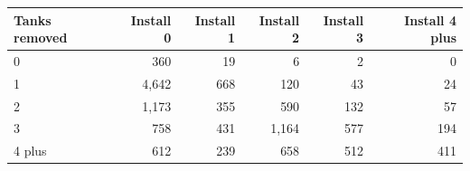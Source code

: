 \begin{tabular}{lrrrrr}
\toprule
Tanks removed & Install 0 & Install 1 & Install 2 & Install 3 & Install 4 plus \\
\midrule
0 &   360 &  19 &     6 &   2 &   0 \\
1 & 4,642 & 668 &   120 &  43 &  24 \\
2 & 1,173 & 355 &   590 & 132 &  57 \\
3 &   758 & 431 & 1,164 & 577 & 194 \\
4 plus &   612 & 239 &   658 & 512 & 411 \\
\bottomrule
\end{tabular}
